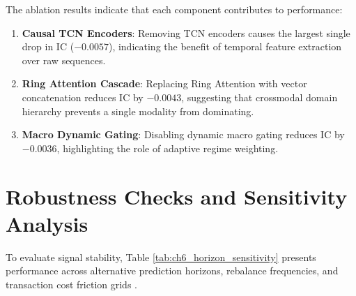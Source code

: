 The ablation results indicate that each component contributes to performance:
\begin{enumerate}
    \item \textbf{Causal TCN Encoders}: Removing TCN encoders \citep{bai2018empirical} causes the largest single drop in IC ($-0.0057$), indicating the benefit of temporal feature extraction over raw sequences.
    \item \textbf{Ring Attention Cascade}: Replacing Ring Attention \citep{vaswani2017attention} with vector concatenation reduces IC by $-0.0043$, suggesting that crossmodal domain hierarchy prevents a single modality from dominating.
    \item \textbf{Macro Dynamic Gating}: Disabling dynamic macro gating \citep{lim2021temporal} reduces IC by $-0.0036$, highlighting the role of adaptive regime weighting.
\end{enumerate}

\section{Robustness Checks and Sensitivity Analysis}
To evaluate signal stability, Table \ref{tab:ch6_horizon_sensitivity} presents performance across alternative prediction horizons, rebalance frequencies, and transaction cost friction grids \citep{novy2016taxonomy, avramov2023machine}.

\begin{table}[H]
\centering
\caption{Predictive Accuracy and Account Compounding Across Prediction Horizons and Fees}
\label{tab:ch6_horizon_sensitivity}
\end{table}

